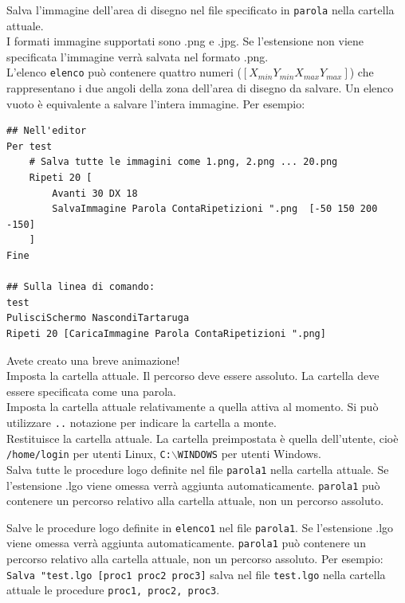 Salva l'immagine dell'area di disegno nel file specificato in \texttt{parola} nella cartella attuale.\\
I formati immagine supportati sono .png e .jpg. Se l'estensione non viene specificata l'immagine verrà salvata nel formato .png.\\
L'elenco \texttt{elenco} può contenere quattro numeri ($[X_{min} Y_{min} X_{max} Y_{max}]$) che rappresentano i due angoli della zona dell'area di disegno da salvare. Un elenco vuoto è equivalente a salvare l'intera immagine. Per esempio:
\begin{lstlisting}[caption="Salvare immagini su disco"]
## Nell'editor
Per test
	# Salva tutte le immagini come 1.png, 2.png ... 20.png
	Ripeti 20 [
		Avanti 30 DX 18
  		SalvaImmagine Parola ContaRipetizioni ".png  [-50 150 200 -150]
	]
Fine 

## Sulla linea di comando:
test
PulisciSchermo NascondiTartaruga 
Ripeti 20 [CaricaImmagine Parola ContaRipetizioni ".png] 
\end{lstlisting}
Avete creato una breve animazione!\\

Imposta la cartella attuale. Il percorso deve essere assoluto. La cartella deve essere specificata come una parola.\\

Imposta la cartella attuale relativamente a quella attiva al momento. Si può utilizzare \texttt{..} notazione per indicare la cartella a monte.\\

Restituisce la cartella attuale. La cartella preimpostata è quella dell'utente, cioè \texttt{/home/login} per utenti Linux, \texttt{C:$\backslash$WINDOWS} per utenti Windows.\\

Salva tutte le procedure logo definite nel file \texttt{parola1} nella cartella attuale. Se l'estensione .lgo viene omessa verrà aggiunta automaticamente. \texttt{parola1} può contenere un percorso relativo alla cartella attuale, non un percorso assoluto.

Salve le procedure logo definite in \texttt{elenco1} nel file \texttt{parola1}. Se l'estensione .lgo viene omessa verrà aggiunta automaticamente. \texttt{parola1} può contenere un percorso relativo alla cartella attuale, non un percorso assoluto.
Per esempio: \texttt{Salva "test.lgo [proc1 proc2 proc3]} salva nel file \texttt{test.lgo} nella cartella attuale le procedure \texttt{proc1, proc2, proc3}.

